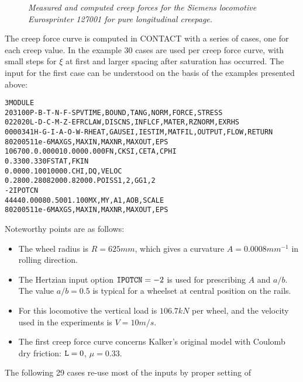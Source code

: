 \documentclass[12pt]{report}
\begin{document}
\begin{figure}[bt]
\centering
{}
\caption{\em Measured and computed creep forces for the Siemens locomotive
Eurosprinter 127001 for pure longitudinal creepage.}
\label{fig:tractcurv}
\end{figure}

The creep force curve is computed in CONTACT with a series of cases, one
for each creep value. In the example 30 cases are used per creep force
curve, with small steps for $\xi$ at first and larger spacing after
saturation has occurred. The input for the first case can be understood on
the basis of the examples presented above:
\begin{alltt}\small
 3 MODULE
  203100     P-B-T-N-F-S        PVTIME, BOUND , TANG  , NORM , FORCE, STRESS
  022020     L-D-C-M-Z-E        FRCLAW, DISCNS, INFLCF, MATER, RZNORM, EXRHS
 0000341   H-G-I-A-O-W-R  HEAT, GAUSEI, IESTIM, MATFIL, OUTPUT, FLOW, RETURN
    80   200    5    1      1e-6    MAXGS , MAXIN , MAXNR , MAXOUT, EPS
 106700.      0.00001    0.000      0.000           FN, CKSI, CETA, CPHI
   0.330      0.330                                 FSTAT, FKIN
   0.000      0.100      10000.                     CHI, DQ, VELOC
   0.280      0.280      82000.     82000.          POISS 1,2,  GG 1,2
   -2                                               IPOTCN
   44   44    0.0008     0.500      1.100           MX,MY,A1,AOB,SCALE
    80   200    5    1      1e-6    MAXGS , MAXIN , MAXNR , MAXOUT, EPS
\end{alltt}
Noteworthy points are as follows:
\begin{itemize}
\item The wheel radius is $R=625\unit{mm}$, which gives a curvature
        $A=0.0008\unit{mm^{-1}}$ in rolling direction.
\item The Hertzian input option ${\tt IPOTCN}=-2$ is used for prescribing
        $A$ and $a/b$. The value $a/b=0.5$ is typical for a wheelset
        at central position on the rails.
\item For this locomotive the vertical load is $106.7\unit{kN}$ per wheel, and
        the velocity used in the experiments is $V=10\unit{m/s}$.
\item The first creep force curve concerns Kalker's original model with
        Coulomb dry friction: ${\tt L}=0$, $\mu=0.33$.
\end{itemize}
The following 29 cases re-use most of the inputs by proper setting of
\end{document}
